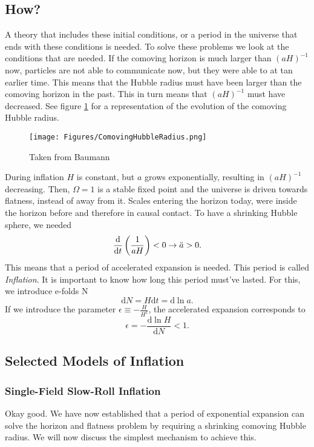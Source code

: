 \documentclass[12pt]{article}
\begin{document}
\subsection{How?}
A theory that includes these initial conditions, or a period in the universe that ends with these conditions is needed. To solve these problems we look at the conditions that are needed. If the comoving horizon is much larger than $(aH)^{-1}$ now, particles are not able to communicate now, but they were able to at tan earlier time. This means that the Hubble radius must have been larger than the comoving horizon in the past. This in turn means that $(aH)^{-1}$ must have decreased. See figure \ref{fig:hubble_radius} for a representation of the evolution of the comoving Hubble radius. 
\begin{figure}
    \centering
    \texttt{[image: Figures/ComovingHubbleRadius.png]}
    \caption{Taken from Baumann}
    \label{fig:hubble_radius}
\end{figure}
During inflation $H$ is constant, but $a$ grows exponentially, resulting in $(aH)^{-1}$ decreasing. Then, $\Omega = 1$ is a stable fixed point and the universe is driven towards flatness, instead of away from it. Scales entering the horizon today, were inside the horizon before and therefore in causal contact. To have a shrinking Hubble sphere, we needed
\begin{equation}
    \frac{\mathrm{d}}{\mathrm{d}t}\left(\frac{1}{aH}\right) < 0\\ 
    \rightarrow \ddot{a} > 0.
\end{equation}
This means that a period of accelerated expansion is needed. This period is called \textit{Inflation}. It is important to know how long this period must've lasted. For this, we introduce e-folds N
\begin{equation}
    \mathrm{d}N = H\mathrm{d}t = \mathrm{d}\ln a.
\end{equation}
If we introduce the parameter $\epsilon \equiv - \frac{ \dot{H}}{H^2}$, the accelerated expansion corresponds to 
\begin{equation}
    \epsilon = - \frac{\mathrm{d}\ln H}{\mathrm{d}N}<1.
\end{equation}

\subsection{Selected Models of Inflation}
\subsubsection{Single-Field Slow-Roll Inflation}
Okay good. We have now established that a period of exponential expansion can solve the horizon and flatness problem by requiring a shrinking comoving Hubble radius. We will now discuss the simplest mechanism to achieve this. 
\end{document}
